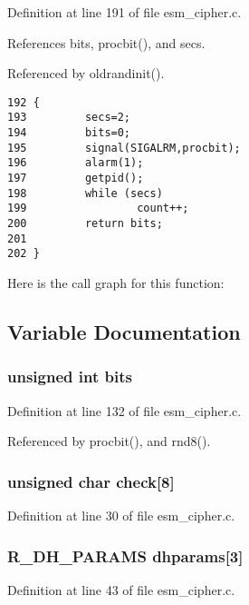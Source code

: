 Definition at line 191 of file esm\_\-cipher.c.

References bits, procbit(), and secs.

Referenced by oldrandinit().



\footnotesize\begin{verbatim}192 {
193         secs=2;
194         bits=0;
195         signal(SIGALRM,procbit);
196         alarm(1);
197         getpid();
198         while (secs)
199                 count++;
200         return bits;
201         
202 }
\end{verbatim}\normalsize 


Here is the call graph for this function:

\subsection{Variable Documentation}
\subsubsection{\setlength{\rightskip}{0pt plus 5cm}unsigned int {\bf bits}}\label{esm__cipher_8c_a27}




Definition at line 132 of file esm\_\-cipher.c.

Referenced by procbit(), and rnd8().
\subsubsection{\setlength{\rightskip}{0pt plus 5cm}unsigned char {\bf check}[8]}\label{esm__cipher_8c_a8}




Definition at line 30 of file esm\_\-cipher.c.
\subsubsection{\setlength{\rightskip}{0pt plus 5cm}R\_\-DH\_\-PARAMS {\bf dhparams}[3]}\label{esm__cipher_8c_a18}




Definition at line 43 of file esm\_\-cipher.c.
